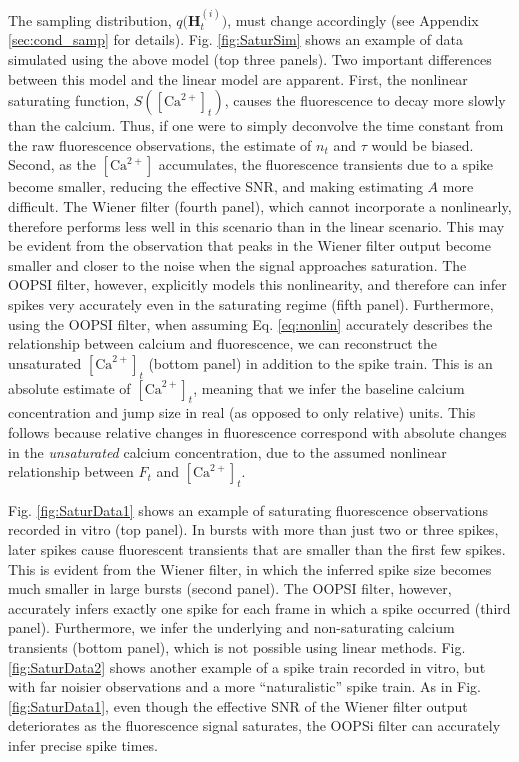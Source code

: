 \documentclass[12pt]{article}
\providecommand{\ve}[1]{\boldsymbol{#1}}
\providecommand{\ve}[1]{\boldsymbol{#1}}
\newcommand{\q}{q\big(\ve{H}_t^{(i)}\big)}
\newcommand{\Ca}{[\text{Ca}^{2+}]}
\begin{document}
\noindent The sampling distribution, $\q$, must change accordingly (see Appendix \ref{sec:cond_samp} for details).  Fig. \ref{fig:SaturSim} shows an example of data simulated using the above model (top three panels).  Two important differences between this model and the linear model are apparent.  First, the nonlinear saturating function, $S(\Ca_t)$,  causes the fluorescence to decay more slowly than the calcium. Thus, if one were to simply deconvolve the time constant from the raw fluorescence observations, the estimate of $n_t$ and $\tau$ would be biased.  Second, as the $\Ca$ accumulates, the fluorescence transients due to a spike become smaller, reducing the effective SNR, and making estimating $A$ more difficult. The Wiener filter (fourth panel), which cannot incorporate a nonlinearly, therefore performs less well in this scenario than in the linear scenario.  This may be evident from the observation that peaks in the Wiener filter output become smaller and closer to the noise when the signal approaches saturation.   The OOPSI filter, however, explicitly models this nonlinearity, and therefore can infer spikes very accurately even in the saturating regime (fifth panel). Furthermore, using the OOPSI filter, when assuming Eq. \ref{eq:nonlin} accurately describes the relationship between calcium and fluorescence, we can reconstruct the unsaturated $\Ca_t$ (bottom panel) in addition to the spike train.  This is an absolute estimate of $\Ca_t$, meaning that we infer the baseline calcium concentration and jump size in real (as opposed to only relative) units. This follows because relative changes in fluorescence correspond with absolute changes in the \emph{unsaturated} calcium concentration, due to the assumed nonlinear relationship between $F_t$ and $\Ca_t$.  

Fig. \ref{fig:SaturData1} shows an example of saturating fluorescence observations recorded in vitro (top panel).  In bursts with more than just two or three spikes, later spikes cause fluorescent transients that are smaller than the first few spikes.  This is evident from the Wiener filter, in which the inferred spike size becomes much smaller in large bursts (second panel).  The OOPSI filter, however, accurately infers exactly one spike for each frame in which a spike occurred (third panel). Furthermore, we infer the underlying and non-saturating calcium transients (bottom panel), which is not possible using linear methods.  Fig. \ref{fig:SaturData2} shows another example of a spike train recorded in vitro, but with far noisier observations and a more ``naturalistic'' spike train. As in Fig. \ref{fig:SaturData1}, even though the effective SNR of the Wiener filter output deteriorates as the fluorescence signal saturates, the OOPSi filter can accurately infer precise spike times.
\end{document}
